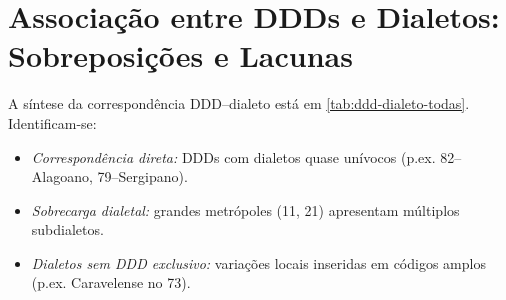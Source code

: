 \section{Associação entre DDDs e Dialetos: Sobreposições e Lacunas}
A síntese da correspondência DDD–dialeto está em \autoref{tab:ddd-dialeto-todas}. Identificam-se:
\begin{itemize}
  \item \emph{Correspondência direta:} DDDs com dialetos quase unívocos (p.ex. 82–Alagoano, 79–Sergipano).
  \item \emph{Sobrecarga dialetal:} grandes metrópoles (11, 21) apresentam múltiplos subdialetos.
  \item \emph{Dialetos sem DDD exclusivo:} variações locais inseridas em códigos amplos (p.ex. Caravelense no 73).
\end{itemize}

